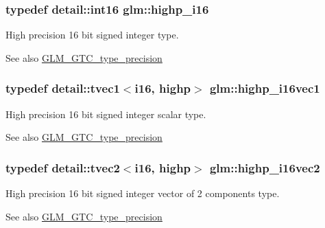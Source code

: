 \subsubsection[{\texorpdfstring{highp\+\_\+i16}{highp_i16}}]{\setlength{\rightskip}{0pt plus 5cm}typedef detail\+::int16 {\bf glm\+::highp\+\_\+i16}}\hypertarget{group__gtc__type__precision_gaa04399853952dbce29cb62e2432f350a}{}\label{group__gtc__type__precision_gaa04399853952dbce29cb62e2432f350a}
High precision 16 bit signed integer type. \begin{DoxySeeAlso}{See also}
\hyperlink{group__gtc__type__precision}{G\+L\+M\+\_\+\+G\+T\+C\+\_\+type\+\_\+precision} 
\end{DoxySeeAlso}
\subsubsection[{\texorpdfstring{highp\+\_\+i16vec1}{highp_i16vec1}}]{\setlength{\rightskip}{0pt plus 5cm}typedef detail\+::tvec1$<$i16, highp$>$ {\bf glm\+::highp\+\_\+i16vec1}}\hypertarget{group__gtc__type__precision_ga0ed3103e2d3acb4efbe313add4243a72}{}\label{group__gtc__type__precision_ga0ed3103e2d3acb4efbe313add4243a72}
High precision 16 bit signed integer scalar type. \begin{DoxySeeAlso}{See also}
\hyperlink{group__gtc__type__precision}{G\+L\+M\+\_\+\+G\+T\+C\+\_\+type\+\_\+precision} 
\end{DoxySeeAlso}
\subsubsection[{\texorpdfstring{highp\+\_\+i16vec2}{highp_i16vec2}}]{\setlength{\rightskip}{0pt plus 5cm}typedef detail\+::tvec2$<$i16, highp$>$ {\bf glm\+::highp\+\_\+i16vec2}}\hypertarget{group__gtc__type__precision_ga74df9e215c049f82d277473c4c974bb4}{}\label{group__gtc__type__precision_ga74df9e215c049f82d277473c4c974bb4}
High precision 16 bit signed integer vector of 2 components type. \begin{DoxySeeAlso}{See also}
\hyperlink{group__gtc__type__precision}{G\+L\+M\+\_\+\+G\+T\+C\+\_\+type\+\_\+precision} 
\end{DoxySeeAlso}
